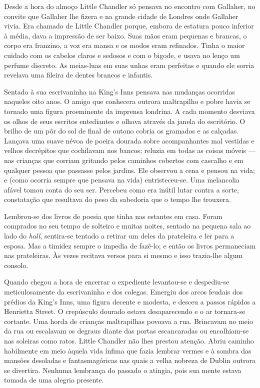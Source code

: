 Desde a hora do almoço Little Chandler só pensava no encontro com Gallaher, no
convite que Gallaher lhe fizera e na grande cidade de Londres onde Gallaher
vivia.  Era chamado de Little Chandler porque, embora de estatura pouco
inferior à média, dava a impressão de ser baixo.  Suas mãos eram pequenas e
brancas, o corpo era franzino, a voz era mansa e os modos eram refinados.
Tinha o maior cuidado com os cabelos claros e sedosos e com o bigode, e usava
no lenço um perfume discreto.  As meias-luas em suas unhas eram perfeitas e
quando ele sorria revelava uma fileira de dentes brancos e infantis.

Sentado à sua escrivaninha na King’s Inns pensava nas mudanças ocorridas
naqueles oito anos.  O amigo que conhecera outrora maltrapilho e pobre havia se
tornado uma figura proeminente da imprensa londrina.  A cada momento desviava
os olhos de seus escritos entediantes e olhava através da janela do escritório.
O brilho de um pôr do sol de final de outono cobria os gramados e as calçadas.
Lançava uma suave névoa de poeira dourada sobre acompanhantes mal vestidas e
velhos decrépitos que cochilavam nos bancos; reluzia em todas as coisas móveis
--- nas crianças que corriam gritando pelos caminhos cobertos com cascalho e em
qualquer pessoa que passasse pelos jardins.  Ele observou a cena e pensou na
vida; e (como ocorria sempre que pensava na vida) entristeceu-se.  Uma
melancolia afável tomou conta do seu ser.  Percebeu como era inútil lutar
contra a sorte, constatação que resultava do peso da sabedoria que o tempo lhe
trouxera.

Lembrou-se dos livros de poesia que tinha nas estantes em casa.  Foram
comprados no seu tempo de solteiro e muitas noites, sentado na pequena sala ao
lado do \textit{hall}, sentira-se tentado a retirar um deles da prateleira e
ler para a esposa.  Mas a timidez sempre o impedia de fazê-lo; e então os
livros permaneciam nas prateleiras.  Às vezes recitava versos para si mesmo e
isso trazia-lhe algum consolo.

Quando chegou a hora de encerrar o expediente levantou-se e despediu-se
meticulosamente da escrivaninha e dos colegas.  Emergiu dos arcos feudais dos
prédios da King’s Inns, uma figura decente e modesta, e desceu a passos rápidos
a Henrietta Street.  O crepúsculo dourado estava desaparecendo e o ar
tornara-se cortante.  Uma horda de crianças maltrapilhas povoava a rua.
Brincavam no meio da rua ou escalavam os degraus diante das portas escancaradas
ou encolhiam-se nas soleiras como ratos.  Little Chandler não lhes prestou
atenção.  Abriu caminho habilmente em meio àquela vida ínfima que fazia lembrar
vermes e à sombra das mansões desoladas e fantasmagóricas nas quais a velha
nobreza de Dublin outrora se divertira.  Nenhuma lembrança do passado o
atingia, pois sua mente estava tomada de uma alegria presente.

